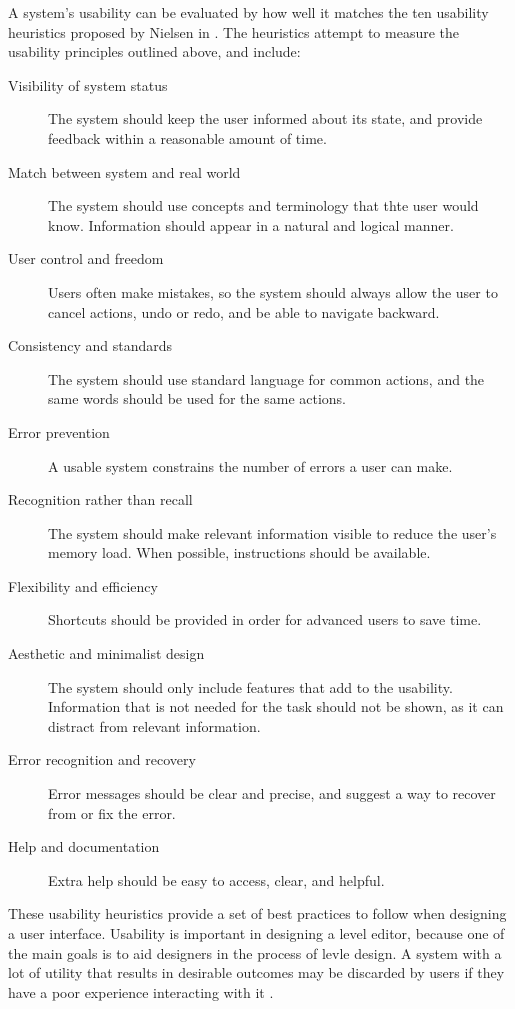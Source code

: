A system's usability can be evaluated by how well it matches the ten usability heuristics
proposed by Nielsen in \cite{nielsen2005}. The heuristics attempt to measure the usability
principles outlined above, and include:

\begin{description}
    \item [Visibility of system status] The system should keep the user informed about its state, and provide feedback within a reasonable amount of time.
    \item [Match between system and real world] The system should use concepts and terminology that thte user would know. Information should appear in a natural and logical manner.
    \item [User control and freedom] Users often make mistakes, so the system should always allow the user to cancel actions, undo or redo, and be able to navigate backward.
    \item [Consistency and standards] The system should use standard language for common actions, and the same words should be used for the same actions.
    \item [Error prevention] A usable system constrains the number of errors a user can make.
    \item [Recognition rather than recall] The system should make relevant information visible to reduce the user's memory load. When possible, instructions should be available.
    \item [Flexibility and efficiency] Shortcuts should be provided in order for advanced users to save time.
    \item [Aesthetic and minimalist design] The system should only include features that add to the usability. Information that is not needed for the task should not be shown, as it can distract from relevant information.
    \item [Error recognition and recovery] Error messages should be clear and precise, and suggest a way to recover from or fix the error.
    \item [Help and documentation] Extra help should be easy to access, clear, and helpful.
\end{description}

These usability heuristics provide a set of best practices to follow when designing a user
interface. Usability is important in designing a level editor, because one of the main
goals is to aid designers in the process of levle design. A system with a lot of utility that
results in desirable outcomes may be discarded by users if they have a poor experience 
interacting with it \cite[p10]{norman2013}.

